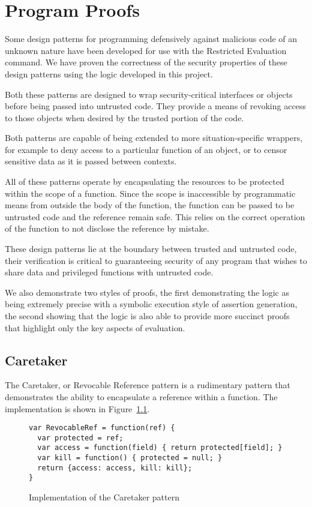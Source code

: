 \documentclass[a4paper,notitlepage]{report}
\begin{document}
\chapter{Program Proofs}
\label{chap:proofs}
Some design patterns for programming defensively against malicious code of an
unknown nature have been developed for use with the Restricted Evaluation
command. We have proven the correctness of the security properties of these
design patterns using the logic developed in this project.

Both these patterns are designed to wrap security-critical interfaces or objects
before being passed into untrusted code. They provide a means of revoking access
to those objects when desired by the trusted portion of the code.

Both patterns are capable of being extended to more situation-specific wrappers,
for example to deny access to a particular function of an object, or to censor
sensitive data as it is passed between contexts.

All of these patterns operate by encapsulating the resources to be protected
within the scope of a function. Since the scope is inaccessible by
programmatic means from outside the body of the function, the function can be
passed to be untrusted code and the reference remain safe. This relies on the
correct operation of the function to not disclose the reference by mistake.

These design patterns lie at the boundary between trusted and untrusted
code, their verification is critical to guaranteeing security of any program
that wishes to share data and privileged functions with untrusted code.

We also demonstrate two styles of proofs, the first demonstrating the logic as
being extremely precise with a symbolic execution style of assertion generation, the
second showing that the logic is also able to provide more succinct proofs that
highlight only the key aspects of evaluation.

\section{Caretaker}
The Caretaker, or Revocable Reference pattern is a rudimentary pattern that
demonstrates the ability to encapsulate a reference within a function. The
implementation is shown in Figure~\ref{fig:code:caretaker}.

\begin{figure}[h!]
  \label{fig:code:caretaker}
\begin{verbatim}var RevocableRef = function(ref) {
  var protected = ref;
  var access = function(field) { return protected[field]; }
  var kill = function() { protected = null; }
  return {access: access, kill: kill};
}\end{verbatim}
  \caption{Implementation of the Caretaker pattern}
\end{figure}
\end{document}
